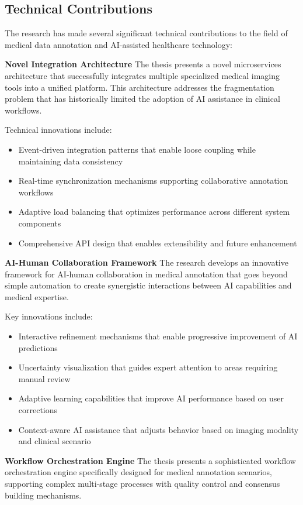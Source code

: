 \subsection{Technical Contributions}

The research has made several significant technical contributions to the field of medical data annotation and AI-assisted healthcare technology:

\textbf{Novel Integration Architecture}
The thesis presents a novel microservices architecture that successfully integrates multiple specialized medical imaging tools into a unified platform. This architecture addresses the fragmentation problem that has historically limited the adoption of AI assistance in clinical workflows.

Technical innovations include:
\begin{itemize}
    \item Event-driven integration patterns that enable loose coupling while maintaining data consistency
    \item Real-time synchronization mechanisms supporting collaborative annotation workflows
    \item Adaptive load balancing that optimizes performance across different system components
    \item Comprehensive API design that enables extensibility and future enhancement
\end{itemize}

\textbf{AI-Human Collaboration Framework}
The research develops an innovative framework for AI-human collaboration in medical annotation that goes beyond simple automation to create synergistic interactions between AI capabilities and medical expertise.

Key innovations include:
\begin{itemize}
    \item Interactive refinement mechanisms that enable progressive improvement of AI predictions
    \item Uncertainty visualization that guides expert attention to areas requiring manual review
    \item Adaptive learning capabilities that improve AI performance based on user corrections
    \item Context-aware AI assistance that adjusts behavior based on imaging modality and clinical scenario
\end{itemize}

\textbf{Workflow Orchestration Engine}
The thesis presents a sophisticated workflow orchestration engine specifically designed for medical annotation scenarios, supporting complex multi-stage processes with quality control and consensus building mechanisms.

